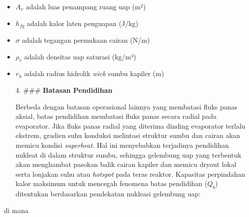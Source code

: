 \documentclass[
]{article}
\begin{document}
\begin{itemize}
\item
  \({A}_{v}\) adalah luas penampang ruang uap (m²)\\
\item
  \({h}_{fg}\) adalah kalor laten penguapan (J/kg)\\
\item
  \(\sigma\) adalah tegangan permukaan cairan (N/m)\\
\item
  \({\rho }_{v}\) adalah densitas uap saturasi (kg/m³)\\
\item
  \({r}_{h}\) adalah radius hidrolik \emph{wick} sumbu kapiler (m)

  4. \#\#\# \textbf{Batasan Pendidihan}

  Berbeda dengan batasan operasional lainnya yang membatasi fluks panas
  aksial, batas pendidihan membatasi fluks panas secara radial pada
  evaporator. Jika fluks panas radial yang diterima dinding evaporator
  terlalu ekstrem, gradien suhu konduksi melintasi struktur sumbu dan
  cairan akan memicu kondisi \emph{superheat}. Hal ini menyebabkan
  terjadinya pendidihan nukleat di dalam struktur sumbu, sehingga
  gelembung uap yang terbentuk akan menghambat pasokan balik cairan
  kapiler dan memicu dryout lokal serta lonjakan suhu atau
  \emph{hotspot} pada teras reaktor. Kapasitas perpindahan kalor
  maksimum untuk mencegah fenomena batas pendidihan (\({Q}_{b}\))
  ditentukan berdasarkan pendekatan nukleasi gelembung uap:
\end{itemize}

\href{https://saxarona.github.io/mathjax-viewer/?input=Q_b\%3D\%5Cfrac\%7B2\%5Cpi\%7B\%7Dl_ek_\%7Beff\%7DT_v\%7D\%7Bh_\%7Bfg\%7D\%5Crho_\%7Bv\%7D\%5Cln(r_i\%2Fr_v)\%7D\%5Cleft\%5B\%5Cfrac\%7B2\%5Csigma\%7B\%7D\%7D\%7Br_n\%7D-P_c\%5Cright\%5D\#0}{}

di mana
\end{document}
